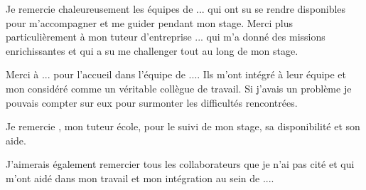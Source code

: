 \begin{center}

    Je remercie chaleureusement les équipes de ... qui ont su se rendre disponibles pour m’accompagner et me guider pendant mon stage. Merci plus particulièrement à mon tuteur d’entreprise ... qui m’a donné des missions enrichissantes et qui a su me challenger tout au long de mon stage.
  
    Merci à ... pour l’accueil dans l'équipe de .... Ils m’ont intégré à leur équipe et mon considéré comme un véritable collègue de travail. Si j’avais un problème je pouvais compter sur eux pour surmonter les difficultés rencontrées.
    
    Je remercie {\schoolTutor}, mon tuteur école, pour le suivi de mon stage, sa disponibilité et son aide.
    
    J'aimerais également remercier tous les collaborateurs que je n'ai pas cité et qui m'ont aidé dans mon travail et mon intégration au sein de ....

\end{center}